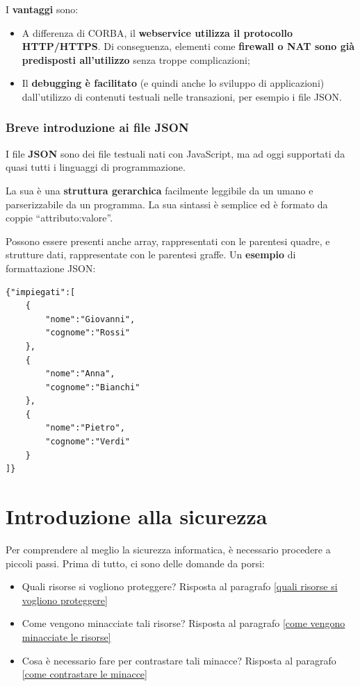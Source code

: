 \documentclass[a4paper]{article}
\newcommand{\dquotes}[1]{``#1''}
\begin{document}
	\noindent
	I \textcolor{Green4}{\textbf{vantaggi}} sono:
	\begin{itemize}
		\item A differenza di CORBA, il \textbf{webservice utilizza il protocollo HTTP/HTTPS}. Di conseguenza, elementi come \textbf{firewall o NAT sono già predisposti all'utilizzo} senza troppe complicazioni;
		
		\item Il \textbf{debugging è facilitato} (e quindi anche lo sviluppo di applicazioni) dall'utilizzo di contenuti testuali nelle transazioni, per esempio i file JSON.
	\end{itemize}\newpage
	
	\subsubsection{Breve introduzione ai file JSON}
	
	I file \textcolor{Red3}{\textbf{JSON}} sono dei file testuali nati con JavaScript, ma ad oggi supportati da quasi tutti i linguaggi di programmazione.\newline
	
	\noindent
	La sua è una \textbf{struttura gerarchica} facilmente leggibile da un umano e parserizzabile da un programma. La sua sintassi è semplice ed è formato da coppie \dquotes{\textsf{attributo:valore}}.\newline
	
	\noindent
	Possono essere presenti anche array, rappresentati con le parentesi quadre, e strutture dati, rappresentate con le parentesi graffe. Un \textcolor{Green4}{\textbf{esempio}} di formattazione JSON:
	\begin{lstlisting}
{"impiegati":[
	{
		"nome":"Giovanni",
		"cognome":"Rossi"
	},
	{
		"nome":"Anna",
		"cognome":"Bianchi"
	},
	{
		"nome":"Pietro",
		"cognome":"Verdi"
	}
]}\end{lstlisting}\newpage

	\section{Introduzione alla sicurezza}
	
	Per comprendere al meglio la sicurezza informatica, è necessario procedere a piccoli passi. Prima di tutto, ci sono delle domande da porsi:
	\begin{itemize}
		\item Quali risorse si vogliono proteggere? Risposta al paragrafo \ref{quali risorse si vogliono proteggere}
		\item Come vengono minacciate tali risorse? Risposta al paragrafo \ref{come vengono minacciate le risorse}
		\item Cosa è necessario fare per contrastare tali minacce? Risposta al paragrafo \ref{come contrastare le minacce}
	\end{itemize}
\end{document}
